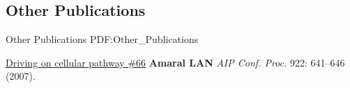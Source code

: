 \vspace*{0.2cm}\subsection
{Other Publications}
{Other Publications}
{PDF:Other_Publications}

\GapNoBreak
\NumberedItem{\makebox[0.8cm][r]{[1]}}
\href{/people/amaral/driving-on-cellular-pathway-66}
{Driving on cellular pathway \#66}
\newline
{\textbf{Amaral LAN}}
\newline
\textit{AIP Conf. Proc.}
    922:
641--646 (2007).
\newline
\Gap
~
\Gap

\vspace*{0.2cm}